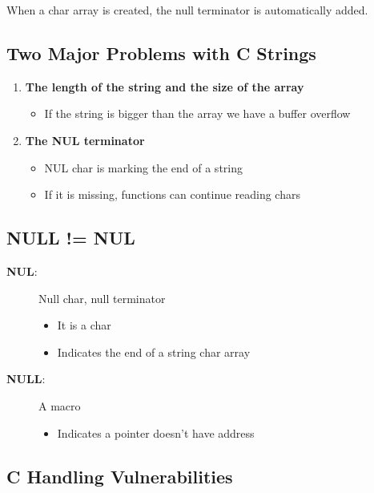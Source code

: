 \documentclass[11pt,a4paper]{article}
\begin{document}
When a char array is created, the null terminator is automatically added.

\subsection{Two Major Problems with C Strings}

\begin{enumerate}
    \item \textbf{The length of the string and the size of the array}
    \begin{itemize}
        \item If the string is bigger than the array we have a buffer overflow
    \end{itemize}
    
    \item \textbf{The NUL terminator}
    \begin{itemize}
        \item NUL char is marking the end of a string
        \item If it is missing, functions can continue reading chars
    \end{itemize}
\end{enumerate}

\subsection{NULL != NUL}

\begin{description}
    \item[\textbf{NUL}:] Null char, null terminator
    \begin{itemize}
        \item It is a char
        \item Indicates the end of a string char array
    \end{itemize}
    
    \item[\textbf{NULL}:] A macro
    \begin{itemize}
        \item Indicates a pointer doesn't have address
    \end{itemize}
\end{description}

\subsection{C Handling Vulnerabilities}
\end{document}
